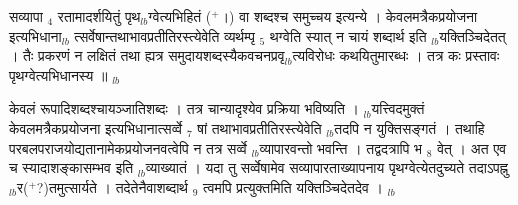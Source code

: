 \documentclass[article,12pt,a4paper]{memoir}%
\newcommand{\add}[1]{($^{+}$#1)}
\newcounter{parCount}
\begin{document}
सव्यापा {\tiny $_{4}$} रतामादर्शयितुं पृथ{\tiny $_{lb}$}ग्वेत्यभिहितं \add{।} वा शब्दश्च समुच्चय इत्यन्ये । केवलमत्रैकप्रयोजना इत्यभिधाना{\tiny $_{lb}$} \leavevmode{} त्सर्वेषान्तथाभावप्रतीतिरस्त्येवेति व्यर्थम्पृ {\tiny $_{5}$} थग्वेति स्यात् न चायं शब्दार्थ इति {\tiny $_{lb}$}यक्तिञ्चिदेतत् । तैः प्रकरणं न लक्षितं तथा ह्यत्र समुदायशब्दस्यैकवचनप्रवृ{\tiny $_{lb}$}त्यविरोधः कथयितुमारब्धः । तत्र कः प्रस्तावः पृथग्वेत्यभिधानस्य ॥
	{}
	\pend%
      {\tiny $_{lb}$}

	  
	  \pstart \leavevmode%
	केवलं रूपादिशब्दश्चायञ्जातिशब्दः । तत्र चान्यादृश्येव प्रक्रिया भविष्यति । {\tiny $_{lb}$}यत्त्विदमुक्तं केवलमत्रैकप्रयोजना इत्यभिधानात्सर्व्वे {\tiny $_{7}$} षां तथाभावप्रतीतिरस्त्येवेति {\tiny $_{lb}$}तदपि न युक्तिसङ्गतं । तथाहि परबलपराजयोद्यतानामेकप्रयोजनवत्वेपि न तत्र सर्व्वे {\tiny $_{lb}$}व्यापारवन्तो भवन्ति । तद्वदत्रापि भ {\tiny $_{8}$} वेत् । अत एव च स्यादाशङ्कासम्भव इति {\tiny $_{lb}$}व्याख्यातं । यदा तु सर्व्वेषामेव सव्यापारताख्यापनाय पृथग्वेत्येतदुच्यते तदाऽपह्नु {\tiny $_{lb}$}र\add{?}तमुत्सार्यते । तदेतेनैवाशब्दार्थ {\tiny $_{9}$} \leavevmode{} त्वमपि प्रत्युक्तमिति यक्तिञ्चिदेतदेव ।
	{}
	\pend%
      {\tiny $_{lb}$}
\end{document}
